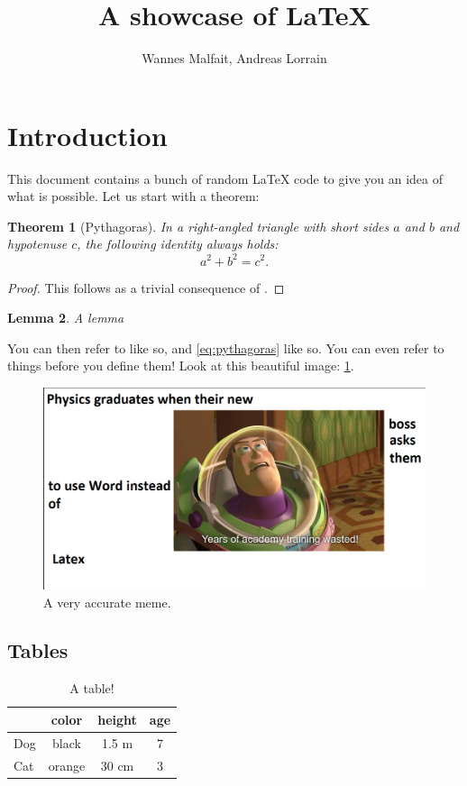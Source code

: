 \documentclass{article}
\title{A showcase of \LaTeX}
\author{Wannes Malfait, Andreas Lorrain}
\theoremstyle{plain}
\newtheorem{theorem}{Theorem}[section] %
\newtheorem{lemma}[theorem]{Lemma}
\theoremstyle{definition}
\theoremstyle{remark}
\begin{document}
\maketitle
\newpage

\tableofcontents
\listoffigures
\listoftables
\newpage

\section{Introduction}

This document contains a bunch of random \LaTeX{} code to give you an idea of what is
possible. Let us start with a theorem:
\begin{theorem}[Pythagoras] %
	\label{thm:pythagoras}
	In a right-angled triangle with short sides $a$ and $b$ and hypotenuse $c$,
	the following identity always holds:
	\begin{equation}\label{eq:pythagoras}
		a^2 + b^2 = c^2.
	\end{equation}
\end{theorem}
\begin{proof}
	This follows as a trivial consequence of \cite[Theorem 6.9]{GeissLeclercSchroer2008PFvar}.
\end{proof}

\begin{lemma}
	A lemma
\end{lemma}

You can then refer to  like so, and \cref{eq:pythagoras} like so.
You can even refer to things before you define them! Look at this beautiful image:
\cref{fig:meme}.
\begin{figure}
	\centering

	\includegraphics[width=0.7\columnwidth, trim={2mm 2mm 2mm 2mm},clip]{meme.png}

	\caption{A very accurate meme.}
	\label{fig:meme}
\end{figure}

\subsection{Tables}
\begin{table}
	\centering
	\begin{tabular}{l|ccc}
		    & color  & height & age \\
		\hline
		Dog & black  & 1.5 m  & 7   \\
		Cat & orange & 30 cm  & 3
	\end{tabular}
	\caption{A table!}
\end{table}
\end{document}
